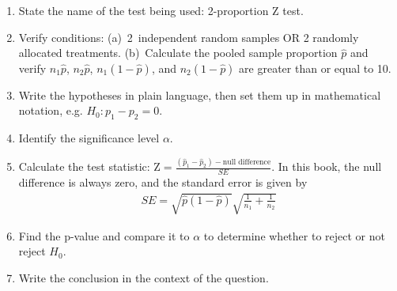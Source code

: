 \begin{termBox}{
\begin{enumerate}
\setlength{\itemsep}{0mm}
\item State the name of the test being used: 2-proportion Z test.
\item Verify conditions: (a)~2~independent random samples OR 2 randomly allocated treatments. (b)~Calculate the pooled sample proportion $\hat{p}$ and verify $n_1\hat{p}$, $n_2\hat{p}$, $n_1(1 - \hat{p})$, and $n_2(1 - \hat{p})$ are greater than or equal to 10.
\item Write the hypotheses in plain language, then set them up in mathematical notation, e.g. $H_0: p_1 - p_2 = 0$.
\item Identify the significance level $\alpha$.
\item Calculate the test statistic: $\text{Z} = \frac{(\hat{p}_1 - \hat{p}_2) - \text{null difference}}{SE}$. In this book, the null difference is always zero, and the standard error is given by\vspace{-3.5mm}
\begin{align*}
SE = \sqrt{\hat{p}(1-\hat{p})}\sqrt{\frac{1}{n_1} + \frac{1}{n_2}}
\end{align*}
\item Find the p-value and compare it to $\alpha$ to determine whether to reject or not reject $H_0$.
\item Write the conclusion in the context of the question.
\end{enumerate}}
\end{termBox}

